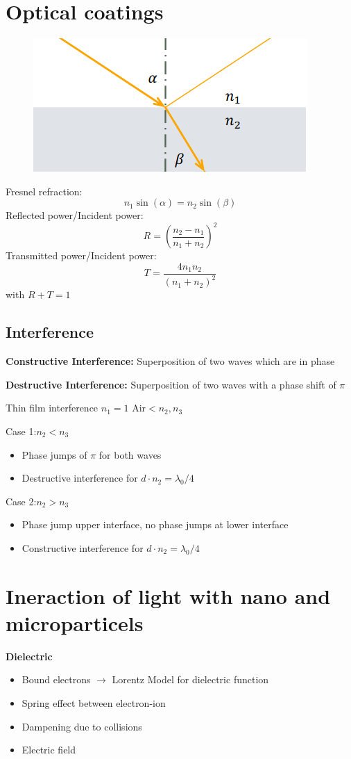 \section{Optical coatings}
\begin{figure}[h]
    \centering
    \includegraphics[width=0.7\columnwidth]{images/fresnel.png}
    \label{fig:fresnel}
\end{figure}
Fresnel refraction:
\[
n_1 \sin(\alpha) = n_2 \sin(\beta)
\]
Reflected power/Incident power:
\[
R = \left(\frac{n_2-n_1}{n_1 + n_2}\right)^2
\]
Transmitted power/Incident power:
\[
T = \frac{4n_1n_2}{\left(n_1+n_2\right)^2}
\]
with \(R + T = 1\)

\subsection{Interference}
\textbf{Constructive Interference:} Superposition of two waves which are in phase

\textbf{Destructive Interference:} Superposition of two waves with a phase shift of \(\pi\)

Thin film interference \(n_1 = 1 \text{ Air} < n_2, n_3\)

Case 1:\(n_2 < n_3\)
\begin{itemize}
    \item Phase jumps of \(\pi\) for both waves
    \item Destructive interference for \(d \cdot n_2 = \lambda_0/4\)
\end{itemize}
Case 2:\(n_2 > n_3\)
\begin{itemize}
    \item Phase jump upper interface, no phase jumps at lower interface
    \item Constructive interference for \(d\cdot n_2 = \lambda_0/4\)
\end{itemize}

\section{Ineraction of light with nano and microparticels}
\textbf{Dielectric}
\begin{itemize}
    \item Bound electrons \(\rightarrow\) Lorentz Model for dielectric function
    \item Spring effect between electron-ion
    \item Dampening due to collisions
    \item Electric field
\end{itemize}

